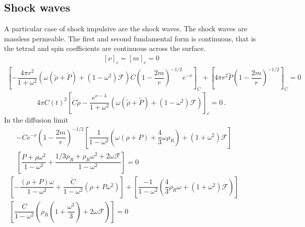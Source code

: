 \documentclass[notitlepage,letterpaper, 10pt]{article}
\begin{document}
\subsection{Shock waves}
A particular case of shock impulsive are the shock waves. The shock waves are massless permeable. The first and second fundamental form is continuous, that is the tetrad and spin coefficients are continuous across the surface.
\begin{eqnarray}
    \left[ \nu \right]_{c}=\left[ m \right]_{c}=0
\end{eqnarray}
\begin{align}
    \left[ -\dfrac{4 \pi r^{2}}{1+\omega^{2}} \left(\omega \left(\tilde{\rho} + \tilde{P} \right)+ \left(1-\omega^{2} \right)\mathcal{F} \right) \dot{C} \left(1-\dfrac{2m}{r} \right)^{-1/2} e^{-\nu} \right]_{C} 
+ \left[4\pi r^{2}\tilde{P}\left(1-\dfrac{2m}{r}  \right)^{-1/2}\right]_{C} = 0
\end{align}
\begin{equation}
  4\pi C(t)^{2}\left[ \dot{C}\tilde{\rho} -\frac{ e^{\nu-\lambda}}{1+\omega^{2}}\left( \omega(\tilde{\rho}+ \tilde{P})+ (1-\omega^{2})\mathcal{F}     \right) \right]_{c} = 0 \, .
    \label{shockwave2}    
\end{equation}
In the diffusion limit
\begin{align}
    -\dot{C} e^{-\nu}\left(1-\dfrac{2m}{r}\right)^{-1/2}\left[ \dfrac{1}{1-\omega^{2}} \left( \omega \left( \rho + P \right) + \dfrac{4}{3}\omega \rho_{R} \right) + \left(1+\omega^{2} \right)\mathcal{F} \right] \quad \quad
    \nonumber \\
    \left[ \dfrac{P + \rho \omega^{2}}{1-\omega^{2}} + \dfrac{1/3 \rho_{R} +\rho_{R}\omega^{2}+ 2\omega \mathcal{F}}{1-\omega^{2}}\right] = 0
\end{align}
\begin{align}
    \left[-\dfrac{\left( \rho +P \right)\omega}{1-\omega^{2}} + \dfrac{\dot{C}}{1-\omega^{2}}\left( \rho + P\omega^{2} \right) \right]+ \left[ \dfrac{-1}{1-\omega^{2}} \left( \dfrac{4}{3} \rho_{R}\omega + \left(1+\omega^{2} \right) \mathcal{F} \right)\right] \quad \quad
    \nonumber \\
    \left[  \dfrac{\dot{C}}{1-\omega^{2}}\left( \rho_{R}\left(1+ \dfrac{\omega^{2}}{3} \right) + 2\omega \mathcal{F}\right)\right] = 0
\end{align}
\end{document}
